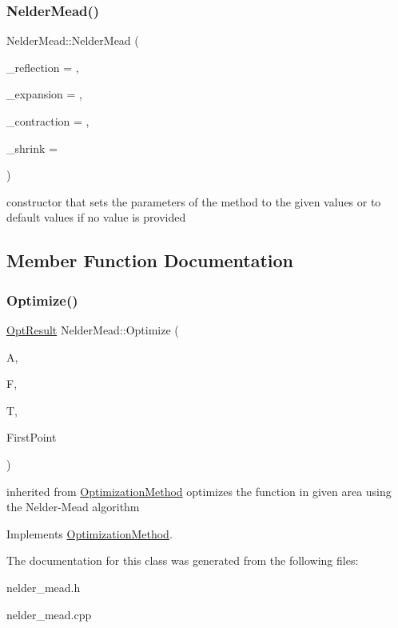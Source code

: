 \subsubsection{\texorpdfstring{Nelder\+Mead()}{NelderMead()}}
{\footnotesize\ttfamily Nelder\+Mead\+::\+Nelder\+Mead (\begin{DoxyParamCaption}\item[{double}]{\+\_\+reflection = {},  }\item[{double}]{\+\_\+expansion = {},  }\item[{double}]{\+\_\+contraction = {},  }\item[{double}]{\+\_\+shrink = {} }\end{DoxyParamCaption})}

constructor that sets the parameters of the method to the given values or to default values if no value is provided 

\subsection{Member Function Documentation}
\mbox{\label{class_nelder_mead_a67ad06a8e8f67f6c6a28bfe2d61afd08}} 
\subsubsection{\texorpdfstring{Optimize()}{Optimize()}}
{\footnotesize\ttfamily \hyperlink{struct_opt_result}{Opt\+Result} Nelder\+Mead\+::\+Optimize (\begin{DoxyParamCaption}\item[{std\+::shared\+\_\+ptr$<$ \hyperlink{class_area}{Area} $>$}]{A,  }\item[{std\+::shared\+\_\+ptr$<$ \hyperlink{class_function}{Function} $>$}]{F,  }\item[{std\+::shared\+\_\+ptr$<$ \hyperlink{class_terminal_condition}{Terminal\+Condition} $>$}]{T,  }\item[{const \hyperlink{classv_point}{v\+Point} \&}]{First\+Point }\end{DoxyParamCaption})\hspace{0.3cm}{\ttfamily [virtual]}}

inherited from \hyperlink{class_optimization_method}{Optimization\+Method} optimizes the function in given area using the Nelder-\/\+Mead algorithm 

Implements \hyperlink{class_optimization_method_a98a1e917667c3ca851cbcd9068b0a9d9}{Optimization\+Method}.



The documentation for this class was generated from the following files\+:\begin{DoxyCompactItemize}
\item 
nelder\+\_\+mead.\+h\item 
nelder\+\_\+mead.\+cpp\end{DoxyCompactItemize}
